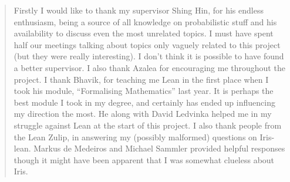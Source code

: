 \renewcommand{\abstractname}{Acknowledgements}

\begin{abstract}
Firstly I would like to thank my supervisor Shing Hin, for his endless enthusiasm, being a source of all knowledge on probabilistic stuff and his availability to discuss even the most unrelated topics.
I must have spent half our meetings talking about topics only vaguely related to this project (but they were really interesting).
I don't think it is possible to have found a better supervisor.
I also thank Azalea for encouraging me throughout the project. I thank Bhavik, for teaching me Lean in the first place when I took his module, ``Formalising Mathematics'' last year. It
is perhaps the best module I took in my degree, and certainly has ended up influencing my direction the most. He along with David Ledvinka helped me
in my struggle against Lean at the start of this project. I also thank people from the Lean Zulip, in answering my (possibly malformed) questions on Iris-lean.
Markus de Medeiros and Michael Sammler provided helpful responses though it might have been apparent that I was somewhat clueless about Iris.



\end{abstract}